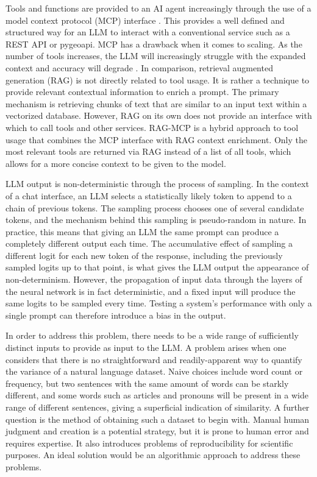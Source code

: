Tools and functions are provided to an AI agent increasingly through the use of a model context
protocol (MCP) interface \citep{linuxfoundation2026}. This provides a well defined and structured
way for an LLM to interact with a conventional service such as a REST API or pygeoapi. MCP has a
drawback when it comes to scaling. As the number of tools increases, the LLM will increasingly
struggle with the expanded context and accuracy will degrade \citep{gan2025}. In comparison,
retrieval augmented generation (RAG) is not directly related to tool usage. It is rather a
technique to provide relevant contextual information to enrich a prompt. The primary mechanism is
retrieving chunks of text that are similar to an input text within a vectorized database.
However, RAG on its own does not provide an interface with which to call tools and other
services. RAG-MCP is a hybrid approach to tool usage that combines the MCP interface with RAG
context enrichment. Only the most relevant tools are returned via RAG instead of a list of all
tools, which allows for a more concise context to be given to the model.

LLM output is non-deterministic through the process of sampling. In the context of a chat
interface, an LLM selects a statistically likely token to append to a chain of previous tokens.
The sampling process chooses one of several candidate tokens, and the mechanism behind this
sampling is pseudo-random in nature. In practice, this means that giving an LLM the same prompt
can produce a completely different output each time. The accumulative effect of sampling a
different logit for each new token of the response, including the previously sampled logits up
to that point, is what gives the LLM output the appearance of non-determinism. However, the
propagation of input data through the layers of the neural network is in fact deterministic, and
a fixed input will produce the same logits to be sampled every time. Testing a system's
performance with only a single prompt can therefore introduce a bias in the output.

In order to address this problem, there needs to be a wide range of sufficiently distinct inputs
to provide as input to the LLM. A problem arises when one considers that there is no
straightforward and readily-apparent way to quantify the variance of a natural language dataset.
Naive choices include word count or frequency, but two sentences with the same amount of words
can be starkly different, and some words such as articles and pronouns will be present in a wide
range of different sentences, giving a superficial indication of similarity. A further question
is the method of obtaining such a dataset to begin with. Manual human judgment and creation is a
potential strategy, but it is prone to human error and requires expertise. It also introduces
problems of reproducibility for scientific purposes. An ideal solution would be an algorithmic
approach to address these problems.


